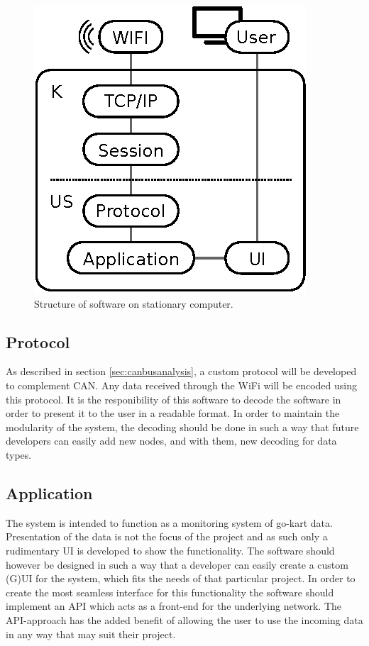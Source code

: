 \begin{figure}[h]
	\centering
	\includegraphics{graphics/stationary_software.eps}
	\caption{Structure of software on stationary computer.}
	\label{fig:setup_ui}
\end{figure}

\subsection{Protocol}
As described in section \ref{sec:canbusanalysis}, a custom protocol will be developed to complement CAN.
Any data received through the WiFi will be encoded using this protocol.
It is the responibility of this software to decode the software in order to present it to the user in a readable format.
In order to maintain the modularity of the system, the decoding should be done in such a way that future developers can easily add new nodes, and with them, new decoding for data types.

\subsection{Application}
The system is intended to function as a monitoring system of go-kart data.
Presentation of the data is not the focus of the project and as such only a rudimentary UI is developed to show the functionality.
The software should however be designed in such a way that a developer can easily create a custom (G)UI for the system, which fits the needs of that particular project.
In order to create the most seamless interface for this functionality the software should implement an API which acts as a front-end for the underlying network.
The API-approach has the added benefit of allowing the user to use the incoming data in any way that may suit their project.

